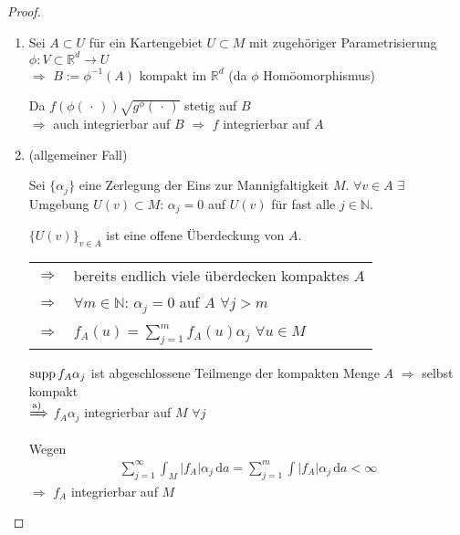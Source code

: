 \begin{proof}\hspace*{0pt}
	\vspace*{-0.8\baselineskip}
	\begin{enumerate}[label={\alph*)}]
	\item Sei $A\subset U$ für ein Kartengebiet $U\subset M$ mit zugehöriger Parametrisierung $\phi\colon V\subset\mathbb{R}^d\to U$ \\
	\hspace*{0.5em}$\Rightarrow$ $B:= \phi^{-1}(A)$ kompakt im $\mathbb{R}^d$ (da $\phi$ Homöomorphismus)
	
	Da $f(\phi(\,\cdot\,))\sqrt{g^\phi(\,\cdot\,)}$ stetig auf $B$ \\
	\hspace*{0.5em}$\Rightarrow$ auch integrierbar auf $B$ $\Rightarrow$ $f$ integrierbar auf $A$
	
	\item (allgemeiner Fall)
	
	Sei $\{\alpha_j\}$ eine Zerlegung der Eins zur Mannigfaltigkeit $M$. $\forall v\in A$ $\exists$ Umgebung $U(v)\subset M$: $\alpha_j = 0$ auf $U(v)$ für fast alle $j\in\mathbb{N}$.
	
	$\{ U(v)\}_{v\in A}$ ist eine offene Überdeckung von $A$.\\
	\begin{tabularx}{\linewidth}{>{$}r<{$}@{$\;\,$}X}
		\Rightarrow & bereits endlich viele überdecken kompaktes $A$ \\
		\Rightarrow & $\forall m\in\mathbb{N}$: $\alpha_j = 0$ auf $A$ $\forall j > m$ \\
		\Rightarrow & $f_A(u) = \sum_{j=1}^m f_A(u)\alpha_j$ $\forall u\in M$ 
	\end{tabularx}

	$\operatorname{supp} f_A \alpha_j$ ist abgeschlossene Teilmenge der kompakten Menge $A$ $\Rightarrow$ selbst kompakt \\
	\hspace*{0.5em}$\xRightarrow{\text{a)}}$ $f_A \alpha_j$ integrierbar auf $M$ $\forall j$
	
	Wegen \begin{align*}
		\sum_{j=1}^\infty \int_M \vert f_A\vert \alpha_j\,\mathrm{d}a = \sum_{j=1}^m \int \vert f_A\vert\alpha_j \,\mathrm{d}a < \infty
	\end{align*}
	$\Rightarrow$ $f_A$ integrierbar auf $M$
	\end{enumerate}
\end{proof}

